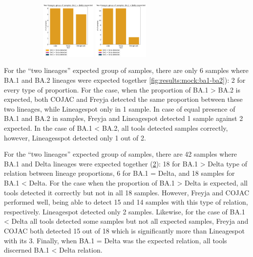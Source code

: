 \begin{figure}[H]
\begin{subfigure}{\linewidth}
                    \includegraphics[width=0.3\textwidth]{figures/results/mock/ba1EQd-bars.png}\hfill
                    \includegraphics[width=0.3\textwidth]{figures/results/mock/ba1Ld-bars.png}
                    \label{fig:results:mock:ba1-delta}
                    \end{subfigure}\par\medskip
                \end{figure}
                
                For the “two lineages” expected group of samples, there are only 6 samples where BA.1 and BA.2 lineages were expected together \cref{fig:results:mock:ba1-ba2}): 2 for every type of proportion. For the case, when the proportion of BA.1 > BA.2 is expected, both COJAC and Freyja detected the same proportion between these two lineages, while Lineagespot only in 1 sample. In case of equal presence of BA.1 and BA.2 in samples, Freyja and Lineagespot detected 1 sample against 2 expected. In the case of BA.1 < BA.2, all tools detected samples correctly, however, Lineagesspot detected only 1 out of 2. 

                For the “two lineages” expected group of samples, there are 42 samples where BA.1 and Delta lineages were expected together (\cref{fig:results:mock:ba1-delta}): 18 for BA.1 > Delta type of relation between lineage proportions, 6 for BA.1 = Delta, and 18 samples for BA.1 < Delta. For the case when the proportion of BA.1 > Delta is expected, all tools detected it correctly but not in all 18 samples. However, Freyja and COJAC performed well, being able to detect 15 and 14 samples with this type of relation, respectively. Lineagespot detected only 2 samples. Likewise, for the case of BA.1 < Delta all tools detected some samples but not all expected samples, Freyja and COJAC both detected 15 out of 18 which is significantly more than Lineagespot with its 3. Finally, when BA.1 = Delta was the expected relation, all tools discerned BA.1 < Delta relation.

